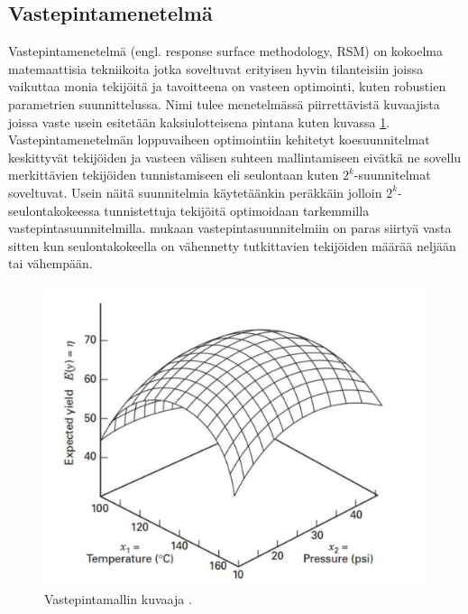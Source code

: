 \documentclass[12pt,a4paper,finnish]{tutthesis}
\begin{document}
\subsection{Vastepintamenetelmä}
\label{vastep}

Vastepintamenetelmä (engl. response surface methodology, RSM)
on kokoelma matemaattisia tekniikoita jotka soveltuvat erityisen hyvin tilanteisiin
joissa vaikuttaa monia tekijöitä ja tavoitteena on vasteen optimointi, kuten
robustien parametrien suunnittelussa. Nimi tulee menetelmässä piirrettävistä
kuvaajista joissa vaste usein esitetään kaksiulotteisena pintana kuten kuvassa \ref{fig:RSM}.
Vastepintamenetelmän loppuvaiheen optimointiin kehitetyt koesuunnitelmat
keskittyvät tekijöiden ja vasteen välisen suhteen mallintamiseen
eivätkä ne sovellu merkittävien tekijöiden tunnistamiseen eli seulontaan kuten $2^k$-suunnitelmat
soveltuvat. Usein näitä suunnitelmia käytetäänkin peräkkäin jolloin
$2^k$-seulontakokeessa tunnistettuja tekijöitä optimoidaan tarkemmilla vastepintasuunnitelmilla.
\textcite{ehandbook} mukaan vastepintasuunnitelmiin on paras siirtyä vasta
sitten kun seulontakokeella on vähennetty tutkittavien tekijöiden määrää
neljään tai vähempään.

\begin{figure}
  \begin{center}
    \includegraphics[scale=0.6]{RSM}
  \end{center}
  \caption[Vastepintamallin kuvaaja]{Vastepintamallin kuvaaja \parencite[s.~479]{Montgomery2012}.}
  \label{fig:RSM}
\end{figure}
\end{document}
